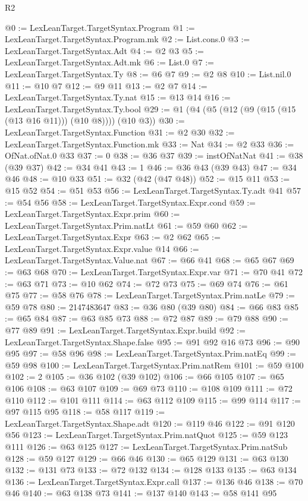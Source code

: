 \begin{lexlean}{R2}
\begin{coremodule}
@0 := LexLeanTarget.TargetSyntax.Program
@1 := LexLeanTarget.TargetSyntax.Program.mk
@2 := List.cons.{0}
@3 := LexLeanTarget.TargetSyntax.Adt
@4 := @2 @3
@5 := LexLeanTarget.TargetSyntax.Adt.mk
@6 := List.{0}
@7 := LexLeanTarget.TargetSyntax.Ty
@8 := @6 @7
@9 := @2 @8
@10 := List.nil.{0}
@11 := @10 @7
@12 := @9 @11
@13 := @2 @7
@14 := LexLeanTarget.TargetSyntax.Ty.nat
@15 := @13 @14
@16 := LexLeanTarget.TargetSyntax.Ty.bool
@29 := @1 (@4 (@5 (@12 (@9 (@15 (@15 (@13 @16 @11))) (@10 @8)))) (@10 @3))
@30 := LexLeanTarget.TargetSyntax.Function
@31 := @2 @30
@32 := LexLeanTarget.TargetSyntax.Function.mk
@33 := Nat
@34 := @2 @33
@36 := OfNat.ofNat.{0} @33
@37 := 0
@38 := @36 @37
@39 := instOfNatNat
@41 := @38 (@39 @37)
@42 := @34 @41
@43 := 1
@46 := @36 @43 (@39 @43)
@47 := @34 @46
@48 := @10 @33
@51 := @32 (@42 (@47 @48))
@52 := @15 @11
@53 := @15 @52
@54 := @51 @53
@56 := LexLeanTarget.TargetSyntax.Ty.adt @41
@57 := @54 @56
@58 := LexLeanTarget.TargetSyntax.Expr.cond
@59 := LexLeanTarget.TargetSyntax.Expr.prim
@60 := LexLeanTarget.TargetSyntax.Prim.natLt
@61 := @59 @60
@62 := LexLeanTarget.TargetSyntax.Expr
@63 := @2 @62
@65 := LexLeanTarget.TargetSyntax.Expr.value @14
@66 := LexLeanTarget.TargetSyntax.Value.nat
@67 := @66 @41
@68 := @65 @67
@69 := @63 @68
@70 := LexLeanTarget.TargetSyntax.Expr.var
@71 := @70 @41
@72 := @63 @71
@73 := @10 @62
@74 := @72 @73
@75 := @69 @74
@76 := @61 @75
@77 := @58 @76
@78 := LexLeanTarget.TargetSyntax.Prim.natLe
@79 := @59 @78
@80 := 2147483647
@83 := @36 @80 (@39 @80)
@84 := @66 @83
@85 := @65 @84
@87 := @63 @85 @73
@88 := @72 @87
@89 := @79 @88
@90 := @77 @89
@91 := LexLeanTarget.TargetSyntax.Expr.build
@92 := LexLeanTarget.TargetSyntax.Shape.false
@95 := @91 @92 @16 @73
@96 := @90 @95
@97 := @58 @96
@98 := LexLeanTarget.TargetSyntax.Prim.natEq
@99 := @59 @98
@100 := LexLeanTarget.TargetSyntax.Prim.natRem
@101 := @59 @100
@102 := 2
@105 := @36 @102 (@39 @102)
@106 := @66 @105
@107 := @65 @106
@108 := @63 @107
@109 := @69 @73
@110 := @108 @109
@111 := @72 @110
@112 := @101 @111
@114 := @63 @112 @109
@115 := @99 @114
@117 := @97 @115 @95
@118 := @58 @117
@119 := LexLeanTarget.TargetSyntax.Shape.adt
@120 := @119 @46
@122 := @91 @120 @56
@123 := LexLeanTarget.TargetSyntax.Prim.natQuot
@125 := @59 @123 @111
@126 := @63 @125
@127 := LexLeanTarget.TargetSyntax.Prim.natSub
@128 := @59 @127
@129 := @66 @46
@130 := @65 @129
@131 := @63 @130
@132 := @131 @73
@133 := @72 @132
@134 := @128 @133
@135 := @63 @134
@136 := LexLeanTarget.TargetSyntax.Expr.call
@137 := @136 @46
@138 := @70 @46
@140 := @63 @138 @73
@141 := @137 @140
@143 := @58 @141 @95

\end{coremodule}
\end{lexlean}
